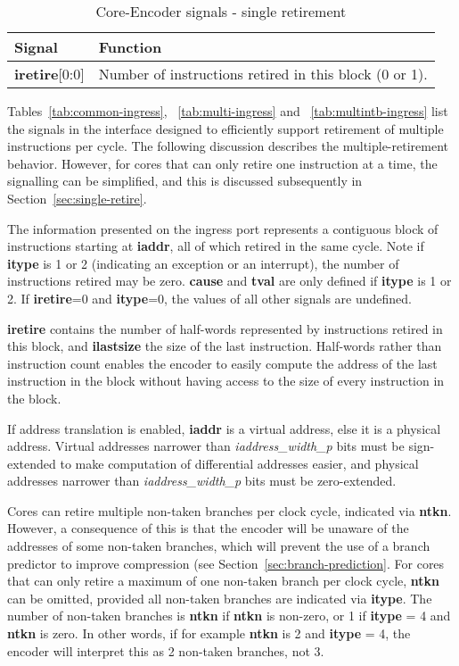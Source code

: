 \begin{table}[htp]
    \centering
    \caption{Core-Encoder signals - single retirement}
    \label{tab:single-ingress}
    \begin{tabulary}{\textwidth}{|l|p{80mm}|}
        \hline
        \textbf {Signal} & \textbf {Function} \\
        \hline
        \textbf{iretire}[0:0] & Number of instructions retired in this block (0 or 1).\\
        \hline
        \hline
    \end{tabulary}
\end{table}

Tables~\ref{tab:common-ingress}, ~\ref{tab:multi-ingress} and ~\ref{tab:multintb-ingress}
list the signals in the interface designed to efficiently support retirement of multiple 
instructions per cycle.  The following discussion describes the multiple-retirement behavior.  
However, for cores that can only retire one instruction at a time, the signalling can be 
simplified, and this is discussed subsequently in Section~\ref{sec:single-retire}.  

The information presented on the ingress port represents a contiguous
block of instructions starting at \textbf{iaddr}, all of which retired
in the same cycle. Note if \textbf{itype} is 1 or 2 (indicating an
exception or an interrupt), the number of instructions retired may be
zero. \textbf{cause} and \textbf{tval} are only defined if
\textbf{itype} is 1 or 2. If \textbf{iretire}=0 and \textbf{itype}=0,
the values of all other signals are undefined.

\textbf{iretire} contains the number of half-words represented by
instructions retired in this block, and \textbf{ilastsize} the size of the last
instruction.  Half-words rather than instruction count enables the encoder to easily compute the address of
the last instruction in the block without having access to the size of every 
instruction in the block.  

If address translation is enabled, \textbf{iaddr} is a virtual
address, else it is a physical address. Virtual addresses narrower
than \textit{iaddress\_width\_p} bits must be sign-extended to make
computation of differential addresses easier, and physical addresses
narrower than \textit{iaddress\_width\_p} bits must be zero-extended.

Cores can retire multiple non-taken branches per clock cycle, indicated via \textbf{ntkn}.
However, a consequence of this is that the encoder will be unaware of the addresses of some non-taken branches, 
which will prevent the use of a branch predictor to improve compression (see Section~\ref{sec:branch-prediction}.
For cores that can only retire a maximum of one non-taken branch per clock cycle,
\textbf{ntkn} can be omitted, provided all non-taken branches are indicated via \textbf{itype}.  
The number of non-taken branches is \textbf{ntkn} if \textbf{ntkn} is non-zero, or 1 if \textbf{itype} = 4 and \textbf{ntkn} is zero.
In other words, if for example \textbf{ntkn} is 2 and \textbf{itype} = 4, the encoder will interpret this as 2 non-taken branches,
not 3.


